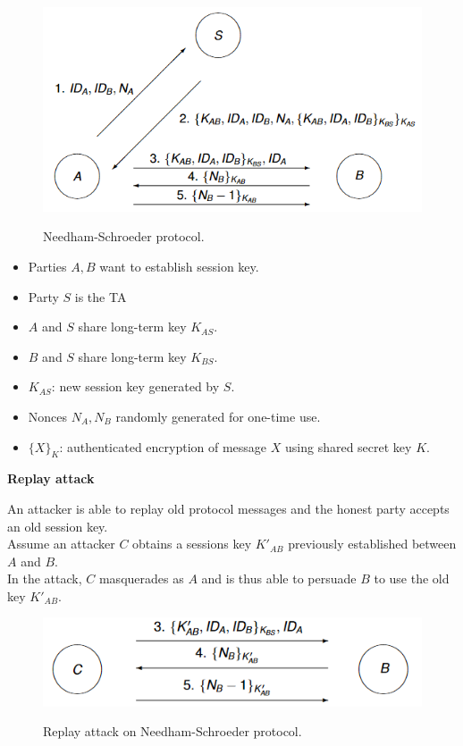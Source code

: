 \documentclass{article}
\begin{document}
\noindent\begin{minipage}{0.6\textwidth}%
\begin{figure}[H]
\centering
\includegraphics[scale=0.7]{Images/needhamschroederprotocol.png}
\label{fig:fround}
\caption{Needham-Schroeder protocol.}
\end{figure}
\end{minipage}%
\hfill%
\begin{minipage}{0.35\textwidth}
\begin{itemize}
    \item Parties $A, B$ want to establish session key.
    \item Party $S$ is the TA
    \item $A$ and $S$ share long-term key $K_{AS}$.
    \item $B$ and $S$ share long-term key $K_{BS}$.
    \item $K_{AS}$: new session key generated by $S$.
    \item Nonces $N_A, N_B$ randomly generated for one-time use.
    \item $\{X\}_K$: authenticated encryption of message $X$ using shared secret key $K$.
\end{itemize}
\end{minipage}

\textbf{Replay attack}

An attacker is able to replay old protocol messages and the honest party accepts an old session key.\\
Assume an attacker $C$ obtains a sessions key $K'_{AB}$ previously established between $A$ and $B$.\\
In the attack, $C$ masquerades as $A$ and is thus able to persuade $B$ to use the old key $K'_{AB}$.

\begin{figure}[H]
\centering
\includegraphics[scale=0.7]{Images/replayattackneedham.png}
\label{fig:fround}
\caption{Replay attack on Needham-Schroeder protocol.}
\end{figure}
\end{document}
